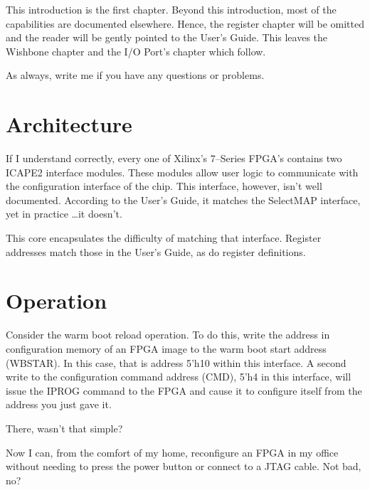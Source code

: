 \documentclass{gqtekspec}
\begin{document}
This introduction is the first chapter.  Beyond this introduction, most
of the capabilities are documented elsewhere.  Hence, the register chapter
will be omitted and the reader will be gently pointed to the User's Guide.
This leaves the Wishbone chapter and the I/O Port's chapter which follow.

As always, write me if you have any questions or problems.

\chapter{Architecture}\label{chap:arch}

If I understand correctly, every one of Xilinx's 7--Series FPGA's contains
two ICAPE2 interface modules.  These modules allow user logic to communicate
with the configuration interface of the chip.  This interface, however, isn't
well documented.  According to the User's Guide, it matches the SelectMAP
interface, yet in practice \ldots it doesn't. 

This core encapsulates the difficulty of matching that interface.  Register
addresses match those in the User's Guide, as do register definitions.

\chapter{Operation}\label{chap:ops}

Consider the warm boot reload operation.  To do this, write the address in
configuration memory of an FPGA image to the warm boot start address (WBSTAR).
In this case, that is address 5'h10 within this interface.  A second write to
the configuration command address (CMD), 5'h4 in this interface, will issue the
IPROG command to the FPGA and cause it to configure itself from the address
you just gave it.

There, wasn't that simple?

Now I can, from the comfort of my home, reconfigure an FPGA in my office without
needing to press the power button or connect to a JTAG cable.  Not bad, no?
\end{document}

